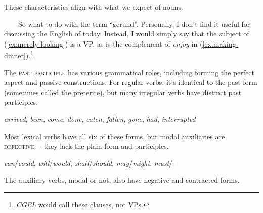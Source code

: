 \begin{tcolorbox}[title=What about gerunds?\is{gerund}, colback=white]
These characteristics align with what we expect of nouns.

~~~~So what to do with the term ``gerund''. Personally, I don't find it useful for discussing the English of today. Instead, I would simply say that the subject of  (\ref{ex:merely-looking}) is a VP, as is the complement of \textit{enjoy} in (\ref{ex:making-dinner}).\footnote{\textit{CGEL} would call these clauses, not VPs.}

\end{tcolorbox}

The \textsc{past participle} has various grammatical roles, including forming the perfect aspect and passive constructions. For regular verbs, it's identical to the past form (sometimes called the preterite), but many irregular verbs have distinct past participles:

\ea \textit{arrived}, \textit{been}, \textit{come}, \textit{done}, \textit{eaten}, \textit{fallen}, \textit{gone}, \textit{had}, \textit{interrupted}\label{ex:past-participles}
\z

Most lexical verbs have all six of these forms, but modal auxiliaries are \textsc{defective}~-- they lack the plain form and participles.\label{sec:defective-modals}

\ea \textit{can}/\textit{could}, \textit{will}/\textit{would}, \textit{shall}/\textit{should}, \textit{may}/\textit{might}, \textit{must}/--
\z

\noindent The auxiliary verbs, modal or not, also have negative and contracted forms.

